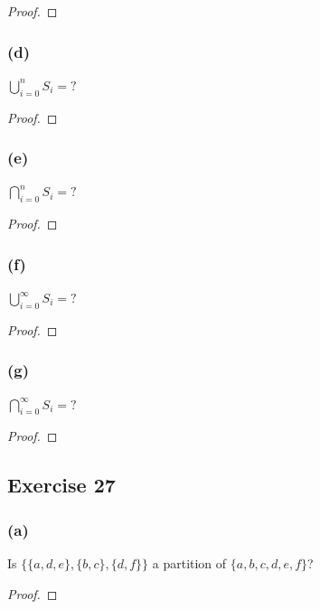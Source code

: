 \documentclass[14pt]{extarticle}
\newcommand{\dps}{\displaystyle}
\begin{document}
\begin{proof}

\end{proof}

\subsubsection{(d)}
\(\dps \bigcup_{i=0}^{n}S_i = ?\)

\begin{proof}

\end{proof}

\subsubsection{(e)}
\(\dps \bigcap_{i=0}^{n}S_i = ?\)

\begin{proof}

\end{proof}

\subsubsection{(f)}
\(\dps \bigcup_{i=0}^{\infty}S_i = ?\)
\begin{proof}

\end{proof}

\subsubsection{(g)}
\(\dps \bigcap_{i=0}^{\infty}S_i = ?\)

\begin{proof}

\end{proof}

\subsection{Exercise 27}

\subsubsection{(a)}
Is \(\{\{a, d, e\}, \{b, c\}, \{d, f\}\}\) a partition of
\(\{a, b, c, d, e, f\}\)?

\begin{proof}

\end{proof}
\end{document}
